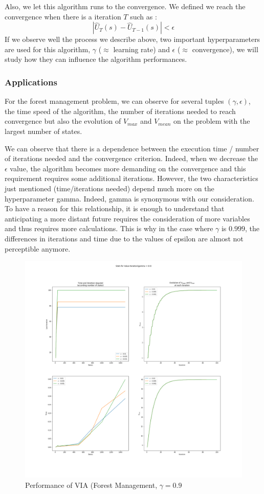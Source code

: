 \documentclass[11pt]{article}
\begin{document}
\begin{multicols}{2}
Also, we let this algorithm runs to the convergence. We defined we reach the convergence when there is a iteration $T$ such as :
$$ \left| \hat{U}_T(s) - \hat{U}_{T-1}(s)  \right| < \epsilon$$
If we observe well the process we describe above, two important hyperparameters are used for this algorithm, $\gamma$ ($\approx$ learning rate) and $\epsilon$ ($\approx $ convergence), we will study how they can influence the algorithm performances.

\subsubsection{Applications}

For the forest management problem, we can observe for several tuples $(\gamma , \epsilon)$, the time speed of the algorithm, the number of iterations needed to reach convergence but also the evolution of $V_{max}$ and $V_{mean}$ on the problem with the largest number of states.

We can observe that there is a dependence between the execution time / number of iterations needed and the convergence criterion. Indeed, when we decrease the $\epsilon$ value, the algorithm becomes more demanding on the convergence and this requirement requires some additional iterations. However, the two characteristics just mentioned (time/iterations needed) depend much more on the hyperparameter gamma. Indeed, gamma is synonymous with our consideration. To have a reason for this relationship, it is enough to understand that anticipating a more distant future requires the consideration of more variables and thus requires more calculations. This is why in the case where $\gamma$ is $0.999$, the differences in iterations and time due to the values of epsilon are almost not perceptible anymore.

\begin{figure}[H]
\centering
\includegraphics[width = 0.9\columnwidth]{VI_FM_0.9.png}
\caption{Performance of VIA (Forest Management, $\gamma = 0.9$}
\end{figure}


\end{multicols}
\end{document}
